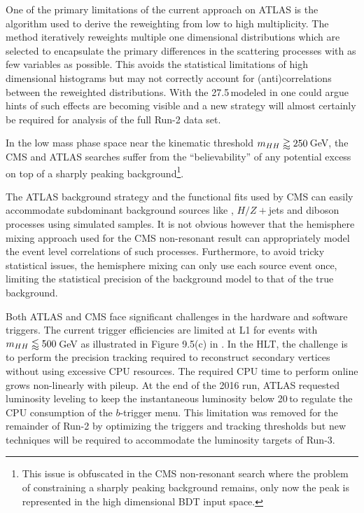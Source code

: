One of the primary limitations of the current approach on ATLAS is the algorithm used to derive the reweighting from low to high \bjet multiplicity.
The method iteratively reweights multiple one dimensional distributions which are selected to encapsulate the primary differences in the scattering processes with as few variables as possible.
This avoids the statistical limitations of high dimensional histograms but may not correctly account for (anti)correlations between the reweighted distributions.
With the 27.5\,\ifb modeled in \cite{Aaboud:2018knk,Bryant:2644551} one could argue hints of such effects are becoming visible and a new strategy will almost certainly be required for analysis of the full Run-2 data set. 

In the low mass phase space near the kinematic threshold $m_{HH}\gtrapprox 250\,$GeV, the CMS and ATLAS searches suffer from the ``believability'' of any potential excess on top of a sharply peaking background\footnote{
  This issue is obfuscated in the CMS non-resonant search where the problem of constraining a sharply peaking background remains, only now the peak is represented in the high dimensional BDT input space.
}.

The ATLAS background strategy and the functional fits used by CMS can easily accommodate subdominant background sources like \ttbar, $H/Z+$jets and diboson processes using simulated samples.
It is not obvious however that the hemisphere mixing approach used for the CMS non-resonant result can appropriately model the event level correlations of such processes.
Furthermore, to avoid tricky statistical issues, the hemisphere mixing can only use each source event once, limiting the statistical precision of the background model to that of the true background. 

Both ATLAS and CMS face significant challenges in the hardware and software triggers.
The current trigger efficiencies are limited at L1 for events with $m_{HH}\lessapprox 500\,$GeV as illustrated in Figure 9.5(c) in \cite{Bryant:2644551}.
In the HLT, the challenge is to perform the precision tracking required to reconstruct secondary vertices without using excessive CPU resources.
The required CPU time to perform online \btagging grows non-linearly with pileup.
At the end of the 2016 run, ATLAS requested luminosity leveling to keep the instantaneous luminosity below 20\,\inbs to regulate the CPU consumption of the $b$-trigger menu.
This limitation was removed for the remainder of Run-2 by optimizing the triggers and tracking thresholds but new techniques will be required to accommodate the luminosity targets of Run-3.


